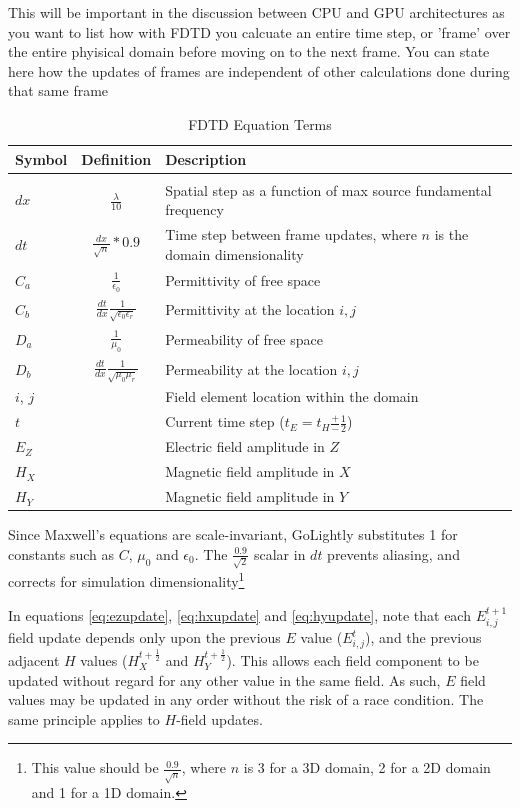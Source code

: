 This will be important in the discussion between CPU and GPU architectures as you want to list how with FDTD you calcuate an entire time step, or 'frame' over the entire phyisical domain before moving on to the next frame.  You can state here how the updates of frames are independent of other calculations done during that same frame
\fi

\begin{table}[h!]
	\centering
	\caption{FDTD Equation Terms}
	\label{tab:modelColorComponentUsage}
	\begin{tabular}{l | c | l}
		Symbol	& Definition & Description \\
		\hline				\\										 	 
		$dx$ 	& $\frac{\lambda}{10}$ 			& Spatial step as a function of max source  fundamental frequency 					\\
		$dt$ 	& $\frac{dx}{\sqrt{n}} * 0.9$		& Time step between frame updates, where $n$ is the domain dimensionality \\		$C_a$	& $\frac{1}{\epsilon_0}$ & Permittivity of free space	\\
		$C_b$	& $\frac{dt}{dx}  \frac{1}{\sqrt{\epsilon_0 \epsilon_r}}$ & Permittivity at the location $i,j$\\
		$D_a$	& $\frac{1}{\mu_0}$	& Permeability of free space \\
		$D_b$	& $\frac{dt}{dx}\frac{1}{\sqrt{\mu_0 \mu_r}}$	& Permeability at the location $i,j$\\
		$i$, $j$ 	& &	Field element location within the domain  \\
		$t$   	& &	Current time step ($t_E = t_H \frac{+}{-}\frac{1}{2}$) \\
		$E_Z$ 	& & Electric field amplitude in $Z$ \\
		$H_X$ 	& & Magnetic field amplitude in $X$ \\
		$H_Y$	& & Magnetic field amplitude in $Y$ \\
	\end{tabular}
\end{table}

Since Maxwell's equations are scale-invariant, GoLightly substitutes 1 for constants such as $C$, $\mu_0$ and $\epsilon_0$. The $\frac{0.9}{\sqrt{2}}$ scalar in $dt$ prevents aliasing, and corrects for simulation dimensionality\footnote{This value should be $\frac{0.9}{\sqrt{n}}$, where $n$ is 3 for a 3D domain, 2 for a 2D domain and 1 for a 1D domain.} 

In equations \ref{eq:ezupdate}, \ref{eq:hxupdate} and \ref{eq:hyupdate}, note that each $E_{i,j}^{t+1}$ field update depends only upon the previous $E$ value ($E_{i,j}^{t}$), and the previous adjacent $H$ values ($H_X^{t+\frac{1}{2}}$ and $H_Y^{t+\frac{1}{2}}$). This allows each field component to be updated without regard for any other value in the same field. As such, $E$ field values may be updated in any order without the risk of a race condition. The same principle applies to $H$-field updates.  

